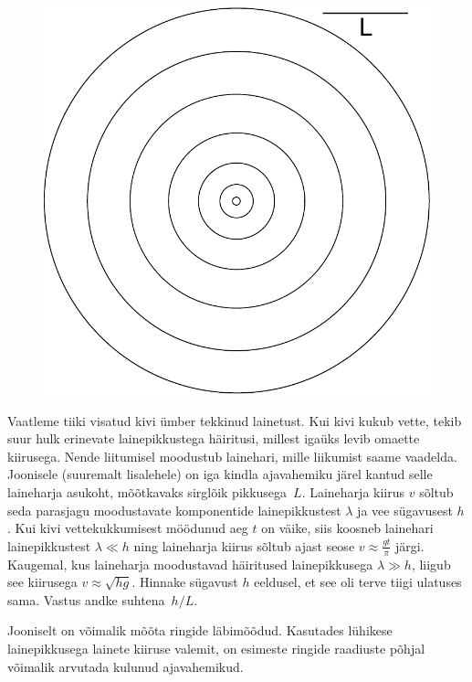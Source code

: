 
\begin{figure}%
\includegraphics[width=\linewidth]{2013-v3g-06-lained}%
\end{figure}
Vaatleme tiiki visatud kivi ümber tekkinud lainetust. Kui kivi kukub vette,
tekib suur hulk erinevate lainepikkustega häiritusi, millest igaüks levib
omaette kiirusega. Nende liitumisel moodustub lainehari, mille liikumist
saame vaadelda. Joonisele (suuremalt lisalehele) on iga kindla ajavahemiku järel kantud selle
laineharja asukoht, mõõtkavaks sirglõik pikkusega~$L$. Laineharja kiirus $v$
sõltub seda parasjagu moodustavate komponentide lainepikkustest $\lambda$ ja vee
sügavusest $h$. Kui kivi vettekukkumisest möödunud aeg $t$ on väike, siis
koosneb lainehari lainepikkustest $\lambda \ll h$ ning laineharja kiirus sõltub
ajast seose $v \approx \frac{gt}{\pi}$ järgi. Kaugemal, kus laineharja
moodustavad häiritused lainepikkusega $\lambda \gg h$, liigub see kiirusega $v
\approx \sqrt{hg}$. Hinnake sügavust $h$ eeldusel, et see oli terve tiigi
ulatuses sama. Vastus andke suhtena~$h/L$.

\hint
Jooniselt on võimalik mõõta ringide läbimõõdud. Kasutades lühikese lainepikkusega lainete kiiruse valemit, on esimeste ringide raadiuste põhjal võimalik arvutada kulunud ajavahemikud.

